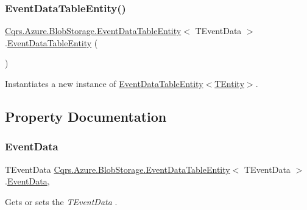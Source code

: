 \subsubsection{\texorpdfstring{Event\+Data\+Table\+Entity()}{EventDataTableEntity()}\hspace{0.1cm}{\footnotesize\ttfamily [2/2]}}
{\footnotesize\ttfamily \hyperlink{classCqrs_1_1Azure_1_1BlobStorage_1_1EventDataTableEntity}{Cqrs.\+Azure.\+Blob\+Storage.\+Event\+Data\+Table\+Entity}$<$ T\+Event\+Data $>$.\hyperlink{classCqrs_1_1Azure_1_1BlobStorage_1_1EventDataTableEntity}{Event\+Data\+Table\+Entity} (\begin{DoxyParamCaption}{ }\end{DoxyParamCaption})}



Instantiates a new instance of \hyperlink{classCqrs_1_1Azure_1_1BlobStorage_1_1EventDataTableEntity_a90c39733d651a5a71497909089e67c1a_a90c39733d651a5a71497909089e67c1a}{Event\+Data\+Table\+Entity$<$\+T\+Entity$>$}. 



\subsection{Property Documentation}
\mbox{\label{classCqrs_1_1Azure_1_1BlobStorage_1_1EventDataTableEntity_a906bcb5198f91069413fc1d8e848866a_a906bcb5198f91069413fc1d8e848866a}} 
\subsubsection{\texorpdfstring{Event\+Data}{EventData}}
{\footnotesize\ttfamily T\+Event\+Data \hyperlink{classCqrs_1_1Azure_1_1BlobStorage_1_1EventDataTableEntity}{Cqrs.\+Azure.\+Blob\+Storage.\+Event\+Data\+Table\+Entity}$<$ T\+Event\+Data $>$.\hyperlink{classCqrs_1_1Events_1_1EventData}{Event\+Data}\hspace{0.3cm}{\ttfamily [get]}, {\ttfamily [set]}}



Gets or sets the {\itshape T\+Event\+Data} . 

